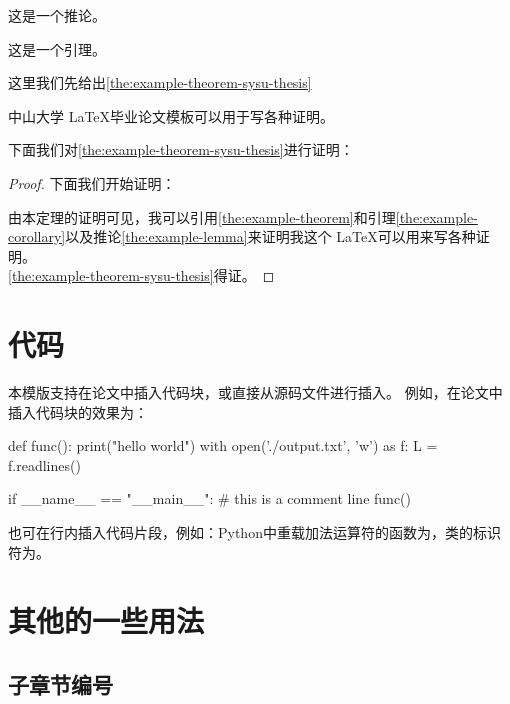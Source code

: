 \begin{corollary}[推论例子]
    \label{the:example-corollary}
    这是一个推论。
\end{corollary}

\begin{lemma}[引理例子]
    \label{the:example-lemma}
    这是一个引理。
\end{lemma}

这里我们先给出\autoref{the:example-theorem-sysu-thesis}

\begin{theorem}[中山大学毕业论文模板定理]
\label{the:example-theorem-sysu-thesis}
中山大学 \LaTeX 毕业论文模板\cite{sysu-thesis}可以用于写各种证明。
\end{theorem}

下面我们对\autoref{the:example-theorem-sysu-thesis}进行证明：


\begin{proof}

下面我们开始证明：

由本定理的证明可见，我可以引用\autoref{the:example-theorem}和引理\ref{the:example-corollary}以及推论\ref{the:example-lemma}来证明我这个 \LaTeX 可以用来写各种证明。 \\

\autoref{the:example-theorem-sysu-thesis}得证。
\end{proof}

\section{代码}

本模版支持在论文中插入代码块，或直接从源码文件进行插入。
例如，在论文中插入代码块的效果为：
\begin{python}
def func():
    print("hello world")
    with open('./output.txt', 'w') as f:
        L = f.readlines()

if __name__ == "__main__":
    # this is a comment line
    func()
\end{python}
也可在行内插入代码片段，例如：Python中重载加法运算符的函数为，类的标识符为。


\section{其他的一些用法}
\label{sec:font}
\subsection{子章节编号}
\label{sec:font:subsection}
